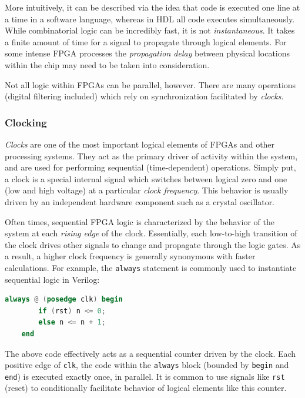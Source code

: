 \documentclass[reprint,amsmath,amssymb]{revtex4-2}
\begin{document}
More intuitively, it can be described via the idea that code is executed one line at a time in a software language, whereas in HDL all code executes simultaneously. While combinatorial logic can be incredibly fast, it is not \textit{instantaneous}. It takes a finite amount of time for a signal to propagate through logical elements. For some intense FPGA processes the \textit{propagation delay} between physical locations within the chip may need to be taken into consideration.

Not all logic within FPGAs can be parallel, however. There are many operations (digital filtering included) which rely on synchronization facilitated by \textit{clocks}.

\subsubsection{Clocking}

\textit{Clocks} are one of the most important logical elements of FPGAs and other processing systems. They act as the primary driver of activity within the system, and are used for performing sequential (time-dependent) operations. Simply put, a clock is a special internal signal which switches between logical zero and one (low and high voltage) at a particular \textit{clock frequency}. This behavior is usually driven by an independent hardware component such as a crystal oscillator.

Often times, sequential FPGA logic is characterized by the behavior of the system at each \textit{rising edge} of the clock. Essentially, each low-to-high transition of the clock drives other signals to change and propagate through the logic gates. As a result, a higher clock frequency is generally synonymous with faster calculations. For example, the \verb+always+ statement is commonly used to instantiate sequential logic in Verilog:
\begin{lstlisting}[language=Verilog]
    always @ (posedge clk) begin
        if (rst) n <= 0;
        else n <= n + 1;
    end
\end{lstlisting}

The above code effectively acts as a sequential counter driven by the clock. Each positive edge of \verb+clk+, the code within the \verb+always+ block (bounded by \verb+begin+ and \verb+end+) is executed exactly once, in parallel. It is common to use signals like \verb+rst+ (reset) to conditionally facilitate behavior of logical elements like this counter.
\end{document}
